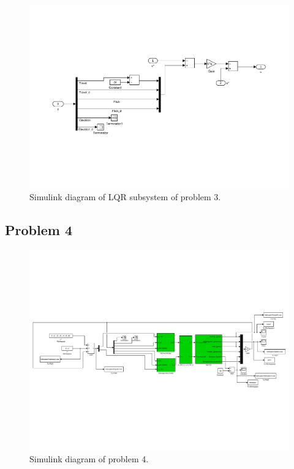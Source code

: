 \begin{figure}[h]
	\centering
	\includegraphics[trim=0 150 0 150,clip,width = \textwidth]{figures/problem3_lqr_simulink.pdf}
	\caption{Simulink diagram of LQR subsystem of problem 3.}
	\label{fig:problem3_lqr_simulink}
\end{figure}
\clearpage
\subsection{Problem 4}
\begin{figure}[h]
	\centering
	\includegraphics[trim=0 190 0 190,clip,width = \textwidth]{figures/problem4_simulink.pdf}
	\caption{Simulink diagram of problem 4.}
	\label{fig:problem4_simulink}
\end{figure}

